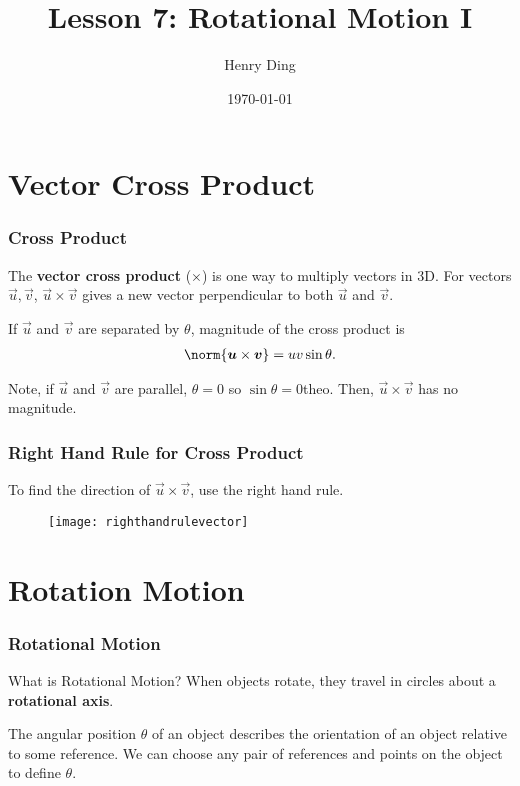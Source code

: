 \documentclass[20pt]{beamer}
\author{Henry Ding}
\date{\today}
\title{Lesson 7: Rotational Motion I}
\begin{document}
\frame{\titlepage}

\section{Vector Cross Product}

\begin{frame}
	\frametitle{Cross Product}
	\begin{definition}
		The \textbf{vector cross product} ($\times$) is one way to multiply vectors in 3D. For vectors $\vec{u}, \vec{v}$, $\vec{u} \times \vec{v}$ gives a new vector perpendicular to both $\vec{u}$ and $\vec{v}$.
	\end{definition}
	\begin{figure}[ht]
		\centering
		\label{fig:crossproduct}
	\end{figure}
	\begin{theorem}
		If $\vec{u}$ and $\vec{v}$ are separated by $\theta$, magnitude of the cross product is
		\begin{align*}
			\norm{\vec{u} \times \vec{v}} = u v \sin \theta.
		\end{align*}
	\end{theorem}
	Note, if $\vec{u}$ and $\vec{v}$ are parallel, $\theta = 0$ so $\sin \theta = 0$theo.  Then, $\vec{u} \times \vec{v}$ has no magnitude.
\end{frame}

\begin{frame}
	\frametitle{Right Hand Rule for Cross Product}
	\begin{theorem}
		To find the direction of $\vec{u} \times \vec{v}$, use the right hand rule.
	\end{theorem}
	\begin{figure}[ht]
		\centering
		\texttt{[image: righthandrulevector]}
		\label{fig:righthandrulevector}
	\end{figure}
\end{frame}

\section{Rotation Motion}

\begin{frame}
	\frametitle{Rotational Motion}
	\begin{block}{What is Rotational Motion?}
		When objects rotate, they travel in circles about a \textbf{rotational axis}.
	\end{block}
	\begin{figure}[ht]
		\centering
		\label{fig:angularpos}
	\end{figure}
	\begin{definition}
		The angular position $\theta$ of an object describes the orientation of an object relative to some reference.
		We can choose any pair of references and points on the object to define $\theta$.
	\end{definition}
\end{frame}
\end{document}

